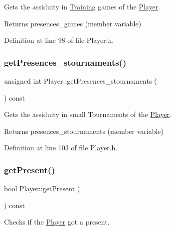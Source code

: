 Gets the assiduity in \hyperlink{class_training}{Training} games of the \hyperlink{class_player}{Player}. 

\begin{DoxyReturn}{Returns}
presences\+\_\+games (member variable) 
\end{DoxyReturn}


Definition at line 98 of file Player.\+h.

\hypertarget{class_player_a0ed8ba4399f59a5e92239d61a99e1260}{}\label{class_player_a0ed8ba4399f59a5e92239d61a99e1260} 
\subsubsection{\texorpdfstring{get\+Presences\+\_\+stournaments()}{getPresences\_stournaments()}}
{\footnotesize\ttfamily unsigned int Player\+::get\+Presences\+\_\+stournaments (\begin{DoxyParamCaption}{ }\end{DoxyParamCaption}) const\hspace{0.3cm}{\ttfamily [inline]}}



Gets the assiduity in small Tournaments of the \hyperlink{class_player}{Player}. 

\begin{DoxyReturn}{Returns}
presences\+\_\+stournaments (member variable) 
\end{DoxyReturn}


Definition at line 103 of file Player.\+h.

\hypertarget{class_player_a4885775d191fbfbac59cf284388c6b0b}{}\label{class_player_a4885775d191fbfbac59cf284388c6b0b} 
\subsubsection{\texorpdfstring{get\+Present()}{getPresent()}}
{\footnotesize\ttfamily bool Player\+::get\+Present (\begin{DoxyParamCaption}{ }\end{DoxyParamCaption}) const\hspace{0.3cm}{\ttfamily [inline]}}



Checks if the \hyperlink{class_player}{Player} got a present. 

